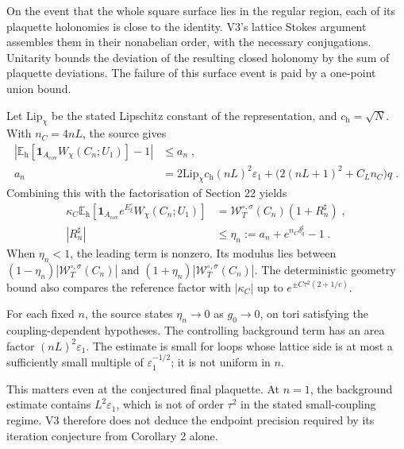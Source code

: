 \documentclass[11pt,a4paper]{article}
\newcommand{\id}{\mathbf 1}
\newcommand{\Eh}{\mathbb E_{\mathrm h}}
\begin{document}
On the event that the whole square surface lies in the regular region, each of its plaquette holonomies is close to the identity. V3's lattice Stokes argument assembles them in their nonabelian order, with the necessary conjugations. Unitarity bounds the deviation of the resulting closed holonomy by the sum of plaquette deviations. The failure of this surface event is paid by a one-point union bound.

Let $\mathrm{Lip}_\chi$ be the stated Lipschitz constant of the representation, and $c_{\mathrm h}=\sqrt N$. With $n_C=4nL$, the source gives
\begin{equation*}
    \begin{aligned}
        \left|\Eh[\id_{A_{\mathrm{cov}}}W_\chi(C_n;U_1)]-1\right|
        &\leq a_n\;,\\
        a_n&=2\mathrm{Lip}_\chi c_{\mathrm h}(nL)^2\varepsilon_1
            +\bigl(2(nL+1)^2+C_Ln_C\bigr)q\;.
    \end{aligned}
\end{equation*}
Combining this with the factorisation of Section 22 yields
\begin{equation*}
    \begin{aligned}
        \kappa_C\Eh[\id_{A_{\mathrm{cov}}}e^{E^\circ_\xi}W_\chi(C_n;U_1)]
            &=\mathcal W_T^{\circ,\sigma}(C_n)(1+R_n^\sharp)\;,\\
        |R_n^\sharp|&\leq \eta_n
            :=a_n+e^{n_C\delta^\sharp_q}-1\;.
    \end{aligned}
\end{equation*}
When $\eta_n<1$, the leading term is nonzero. Its modulus lies between $(1-\eta_n)|\mathcal W_T^{\circ,\sigma}(C_n)|$ and $(1+\eta_n)|\mathcal W_T^{\circ,\sigma}(C_n)|$. The deterministic geometry bound also compares the reference factor with $|\kappa_C|$ up to $e^{\pm C\tau^2(2+1/c)}$.

For each fixed $n$, the source states $\eta_n\to0$ as $g_0\to0$, on tori satisfying the coupling-dependent hypotheses. The controlling background term has an area factor $(nL)^2\varepsilon_1$. The estimate is small for loops whose lattice side is at most a sufficiently small multiple of $\varepsilon_1^{-1/2}$; it is not uniform in $n$.

This matters even at the conjectured final plaquette. At $n=1$, the background estimate contains $L^2\varepsilon_1$, which is not of order $\tau^2$ in the stated small-coupling regime. V3 therefore does not deduce the endpoint precision required by its iteration conjecture from Corollary 2 alone.
\end{document}
